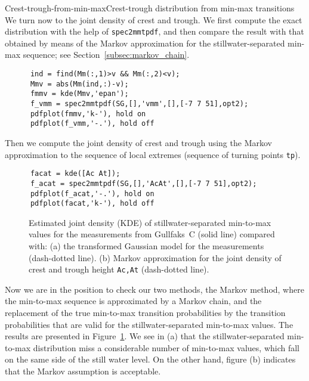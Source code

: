 \begin{rtex}{Crest-trough-from-min-max}{Crest-trough distribution from
min-max transitions}
We turn now to the joint density of crest and trough. We first
compute the exact distribution with the help of \verb+spec2mmtpdf+,
and then compare the result with that obtained by means of the Markov
approximation for the stillwater-separated
min-max sequence; see Section~\ref{subsec:markov_chain}.
{\small\begin{verbatim}
      ind = find(Mm(:,1)>v && Mm(:,2)<v);
      Mmv = abs(Mm(ind,:)-v);
      fmmv = kde(Mmv,'epan');
      f_vmm = spec2mmtpdf(SG,[],'vmm',[],[-7 7 51],opt2);
      pdfplot(fmmv,'k-'), hold on
      pdfplot(f_vmm,'-.'), hold off
\end{verbatim}}
\noindent
Then we compute the joint density of crest and trough
using the Markov approximation to the sequence of local
extremes (sequence of turning points {\tt tp}).
{\small\begin{verbatim}
      facat = kde([Ac At]);
      f_acat = spec2mmtpdf(SG,[],'AcAt',[],[-7 7 51],opt2);
      pdfplot(f_acat,'-.'), hold on
      pdfplot(facat,'k-'), hold off
\end{verbatim}
}

\begin{figure}[tbh]
%
\hfill
{}
\vspace{-3mm}
  \caption[Pdf of stillwater-separated
min-to-max values for Gullfaks~C data]{
Estimated joint density (KDE) of  stillwater-separated
min-to-max values for the
measurements from Gullfaks~C (solid line) compared with:
(a) the transformed Gaussian model for the
measurements (dash-dotted line).
(b) Markov approximation for the joint density of crest and trough
height {\tt Ac,At} (dash-dotted line).
}
  \label{fig79}
\end{figure}

Now we are in the position to check our two methods, the Markov
method, where the min-to-max sequence is approximated by a Markov
chain, and the replacement of the true min-to-max transition
probabilities by the transition probabilities that are valid for the
stillwater-separated min-to-max values. The results are presented
in Figure~\ref{fig79}. We see in (a) that the stillwater-separated
min-to-max distribution miss a considerable number of min-to-max
values, which fall on the same side of the still water level. On the
other hand, figure (b) indicates that
the Markov assumption is acceptable.
\end{rtex}


